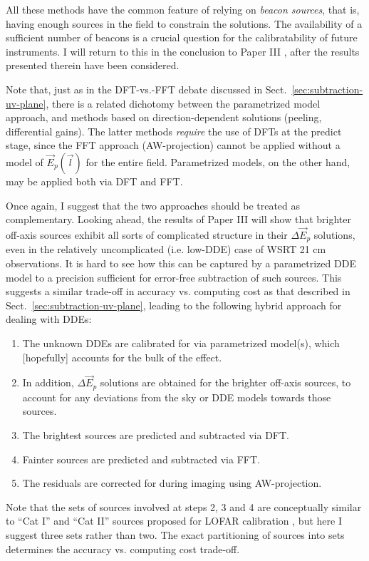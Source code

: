 \documentclass{aa}
\newcommand{\jones}[2]{\vec {#1}_{#2}}
\begin{document}
All these methods have the common feature of relying on \emph{beacon sources}, that is, having enough sources in the field to constrain the solutions. The availability of a sufficient number of beacons is a crucial question for the calibratability of future instruments. I will return to this in the conclusion to Paper III \citep{RRIME3}, after the results presented therein have been considered.

Note that, just as in the DFT-vs.-FFT debate discussed in Sect.~\ref{sec:subtraction-uv-plane}, there is a related dichotomy between the parametrized model approach, and methods based on direction-dependent solutions (peeling, differential gains). The latter methods {\em require} the use of DFTs at the predict stage, since the FFT approach (AW-projection) cannot be applied without a model of $\jones{E}{p}(\vec l)$ for the entire field. Parametrized models, on the other hand, may be applied both via DFT and FFT. 

Once again, I suggest that the two approaches should be treated as complementary. Looking ahead, the results of Paper III \citep{RRIME3} will show that brighter off-axis sources exhibit all sorts of complicated structure in their $\Delta\jones{E}{p}$ solutions, even in the relatively uncomplicated (i.e. low-DDE) case of WSRT 21 cm observations. It is hard to see how this can be captured by a parametrized DDE model to a precision sufficient for error-free subtraction of such sources. This suggests a similar trade-off in accuracy vs. computing cost as that described in Sect.~\ref{sec:subtraction-uv-plane}, leading to the following hybrid approach for dealing with DDEs:

\begin{enumerate}
\item The unknown DDEs are calibrated for via parametrized model(s), which [hopefully] accounts for the bulk of the effect.
\item In addition, $\Delta\jones{E}{p}$ solutions are obtained for the brighter off-axis sources, to account for any deviations from the sky or DDE models towards those sources.
\item The brightest sources are predicted and subtracted via DFT. 
\item Fainter sources are predicted and subtracted via FFT.
\item The residuals are corrected for during imaging using AW-projection.
\end{enumerate}

Note that the sets of sources involved at steps 2, 3 and 4 are conceptually similar to ``Cat I'' and ``Cat II'' sources proposed for LOFAR calibration \citep{JEN:LOFAR3}, but here I suggest three sets rather than two. The exact partitioning of sources into sets determines the accuracy vs. computing cost trade-off.
\end{document}
